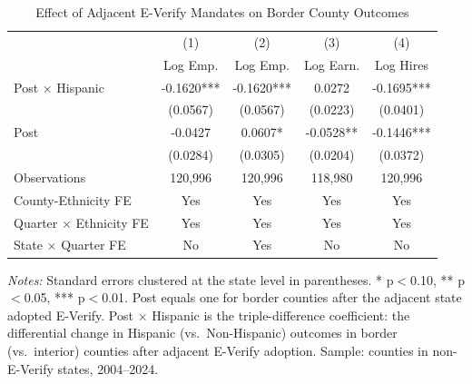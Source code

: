 \begin{table}[H]
\centering
\caption{Effect of Adjacent E-Verify Mandates on Border County Outcomes}
\label{tab:main}
\begin{threeparttable}
\begin{tabular}{lcccc}
\toprule
 & (1) & (2) & (3) & (4) \\
 & Log Emp. & Log Emp. & Log Earn. & Log Hires \\
\midrule
Post $\times$ Hispanic & -0.1620*** & -0.1620*** & 0.0272 & -0.1695*** \\
 & (0.0567) & (0.0567) & (0.0223) & (0.0401) \\[3pt]
Post & -0.0427 & 0.0607* & -0.0528** & -0.1446*** \\
 & (0.0284) & (0.0305) & (0.0204) & (0.0372) \\[6pt]
Observations & 120,996 & 120,996 & 118,980 & 120,996 \\
County-Ethnicity FE & Yes & Yes & Yes & Yes \\
Quarter $\times$ Ethnicity FE & Yes & Yes & Yes & Yes \\
State $\times$ Quarter FE & No & Yes & No & No \\
\bottomrule
\end{tabular}
\begin{tablenotes}[flushleft]
\small
\item \textit{Notes:} Standard errors clustered at the state level in parentheses. * p$<$0.10, ** p$<$0.05, *** p$<$0.01. Post equals one for border counties after the adjacent state adopted E-Verify. Post $\times$ Hispanic is the triple-difference coefficient: the differential change in Hispanic (vs.\ Non-Hispanic) outcomes in border (vs.\ interior) counties after adjacent E-Verify adoption. Sample: counties in non-E-Verify states, 2004--2024.
\end{tablenotes}
\end{threeparttable}
\end{table}
